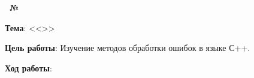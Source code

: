 \begin{center}
    \textbf{\titlePageWorkType~№\titlePageWorkNumber}
\end{center}

\textbf{Тема}: <<\titlePageTopic>>

\textbf{Цель работы}: Изучение методов обработки ошибок в языке С++.

\begin{center}
    \textbf{Ход работы}:
\end{center}


\newpage
